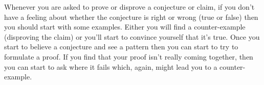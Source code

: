 \noindent Whenever you are asked to prove or disprove a conjecture or claim, if you don't have a feeling about whether the conjecture is right or wrong (true or false) then you should start with some examples.  Either you will find a counter-example (disproving the claim) or you'll start to convince yourself that it's true.  Once you start to believe a conjecture and see a pattern then you can start to try to formulate a proof.  If you find that your proof isn't really coming together, then you can start to ask where it fails which, again, might lead you to a counter-example.



